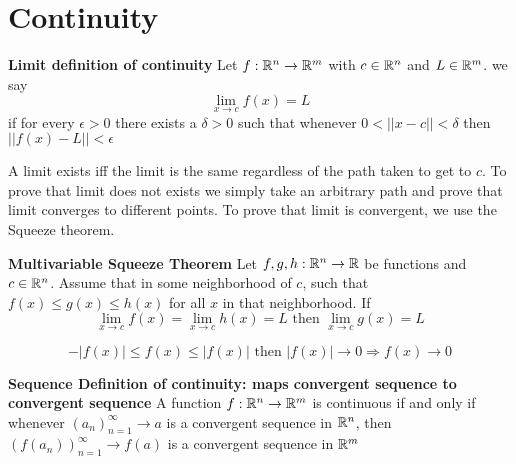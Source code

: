 \documentclass[11pt]{article}
\begin{document}
\section{Continuity}

\begin{defn}
  \label{limit defn of continuity}
  \textbf{Limit definition of continuity} Let $f:\mathbb{R}^n \to\mathbb{R}^m$ with $c\in\mathbb{R}^n$ and $L\in\mathbb{R}^m$. we say
  \[
    \lim_{x\to c} f(x) = L
  \]
  if for every $\epsilon > 0$ there exists a $\delta > 0$ such that whenever $0< || x-c || < \delta$ then $|| f(x)-L || < \epsilon$
  \begin{rem}
    A limit exists iff the limit is the same regardless of the path taken to get to $c$. To prove that limit does not exists we simply take an arbitrary path and prove that limit converges to different points. To prove that limit is convergent, we use the Squeeze theorem.
  \end{rem}
\end{defn}


\begin{theorem}
  \label{Multivariable Squeeze Theorem}
  \textbf{Multivariable Squeeze Theorem} Let $f,g,h: \mathbb{R}^n \to \mathbb{R}$ be functions and $c\in\mathbb{R}^n$. Assume that in some neighborhood of $c$, such that $f(x)\leq g(x)\leq h(x)$ for all $x$ in that neighborhood. If
  \[
    \lim_{x\to c} f(x) = \lim_{x\to c} h(x) = L \text{   then   }  \lim_{x\to c}g(x) = L
  \]
  \begin{rem}
    \[
      -| f(x) | \leq f(x) \leq |f(x)| \text{ then } |f(x)|\to 0 \Rightarrow f(x)\to 0
    \]
  \end{rem}
\end{theorem}

\begin{theorem}
  \label{Sequence definition of continuity}
  \textbf{Sequence Definition of continuity: maps convergent sequence to convergent sequence} A function $f:\mathbb{R}^n\to \mathbb{R}^m$ is continuous if and only if whenever $(a_n)_{n=1}^{\infty} \to a$ is a convergent sequence in $\mathbb{R}^n$, then $(f(a_n))_{n=1}^{\infty} \to f(a)$ is a convergent sequence in $\mathbb{R}^m$
\end{theorem}
\end{document}
